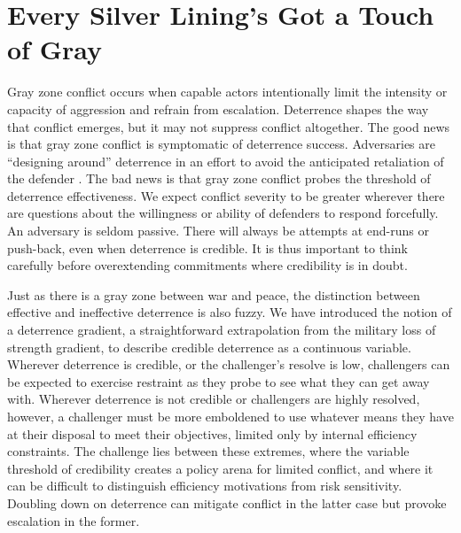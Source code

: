 \documentclass[11pt,letterpaper,pdftex,dvipsnames,table]{article}
\begin{document}
\section{Every Silver Lining's Got a Touch of Gray}
Gray zone conflict occurs when capable actors intentionally limit the intensity or capacity of aggression and refrain from escalation. Deterrence shapes the way that conflict emerges, but it may not suppress conflict altogether. The good news is that gray zone conflict is symptomatic of deterrence success. Adversaries are “designing around” deterrence in an effort to avoid the anticipated retaliation of the defender \citep{lieberman_reconceptualizingdeterrencenudging_2012}. The bad news is that gray zone conflict probes the threshold of deterrence effectiveness. We expect conflict severity to be greater wherever there are questions about the willingness or ability of defenders to respond forcefully. An adversary is seldom passive. There will always be attempts at end-runs or push-back, even when deterrence is credible. It is thus important to think carefully before overextending commitments where credibility is in doubt. 

Just as there is a gray zone between war and peace, the distinction between effective and ineffective deterrence is also fuzzy. We have introduced the notion of a deterrence gradient, a straightforward extrapolation from the military loss of strength gradient, to describe credible deterrence as a continuous variable. Wherever deterrence is credible, or the challenger's resolve is low, challengers can be expected to exercise restraint as they probe to see what they can get away with. Wherever deterrence is not credible or challengers are highly resolved, however, a challenger must be more emboldened to use whatever means they have at their disposal to meet their objectives, limited only by internal efficiency constraints. The challenge lies between these extremes, where the variable threshold of credibility creates a policy arena for limited conflict, and where it can be difficult to distinguish efficiency motivations from risk sensitivity. Doubling down on deterrence can mitigate conflict in the latter case but provoke escalation in the former.
\end{document}
